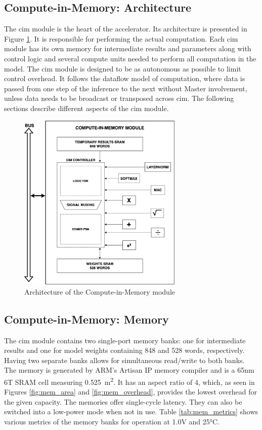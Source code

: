 \subsection{Compute-in-Memory: Architecture}
The \ac{cim} module is the heart of the accelerator. Its architecture is presented in Figure \ref{fig:cim_arch}. It is responsible for performing the actual computation. Each \ac{cim}
module has its own memory for intermediate results and parameters along with control logic and several compute units needed to perform all computation in the model. The \ac{cim} module
is designed to be as autonomous as possible to limit control overhead. It follows the dataflow model of computation, where data is passed from one step of the inference to the next without
Master involvement, unless data needs to be broadcast or transposed across \ac{cim}. The following sections describe different aspects of the \ac{cim} module.
\begin{figure}
    \centering
    \includegraphics[width=0.7\textwidth]{assets/cim_arch.png}
    \caption{Architecture of the Compute-in-Memory module}
    \label{fig:cim_arch}
\end{figure}

\subsection{Compute-in-Memory: Memory}
The \ac{cim} module contains two single-port memory banks: one for intermediate results and one for model weights containing 848 and 528 words, respectively. Having two separate banks
allows for simultaneous read/write to both banks. The memory is generated by ARM's Artisan IP memory compiler and is a 65nm 6T SRAM cell measuring 0.525\si{\mu\square\meter}. It has
an aspect ratio of 4, which, as seen in Figures \ref{fig:mem_area} and \ref{fig:mem_overhead}, provides the lowest overhead for the given capacity. The memories offer single-cycle latency.
They can also be switched into a low-power mode when not in use. Table \ref{tab:mem_metrics} shows various metrics of the memory banks for operation at 1.0V and 25\si{\degreeCelsius}. 

